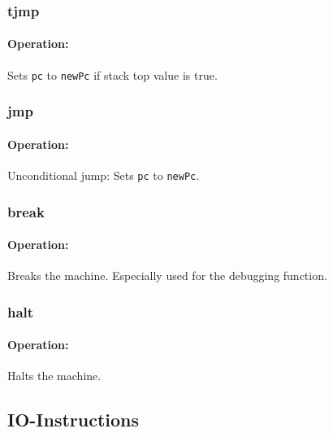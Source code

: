 \subsubsection{tjmp}

\paragraph{Operation:}
Sets \lstinline$pc$ to \lstinline$newPc$ if stack top value is true.

\subsubsection{jmp}

\paragraph{Operation:}
Unconditional jump: Sets \lstinline$pc$ to \lstinline$newPc$.

\subsubsection{break}

\paragraph{Operation:}
Breaks the machine. Especially used for the debugging function.

\subsubsection{halt}

\paragraph{Operation:}
Halts the machine.

\subsection{IO-Instructions}


